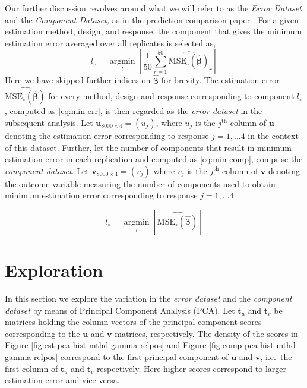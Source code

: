 \documentclass[12pt,3p,authoryear]{elsarticle}
\begin{document}
Our further discussion revolves around what we will refer to as the \emph{Error Dataset} and the \emph{Component Dataset,} as in the prediction comparison paper \citet{rimal2019pred}. For a given estimation method, design, and response, the component that gives the minimum estimation error averaged over all replicates is selected as,
\begin{equation}
  l_\circ = \operatorname*{argmin}_{l}\left[\frac{1}{50}\sum_{r=1}^{50}{\widehat{\text{MSE}_\circ\left(\widehat{\boldsymbol{\beta}}\right)}_{r}}\right]
  \label{eq:min-err}
\end{equation}
Here we have skipped further indices on \(\boldsymbol{\widehat{\boldsymbol{\beta}}}\) for brevity. The estimation error \(\widehat{\text{MSE}_\circ\left(\widehat{\boldsymbol{\beta}}\right)}\) for every method, design and response corresponding to component \(l_\circ\), computed as \eqref{eq:min-err}, is then regarded as the \emph{error dataset} in the subsequent analysis. Let \(\mathbf{u}_{8000\times4}=(u_j)\), where \(u_j\) is the \(j^\text{th}\) column of \(\mathbf{u}\) denoting the estimation error corresponding to response \(j=1, \ldots 4\) in the context of this dataset. Further, let the number of components that
result in minimum estimation error in each replication and computed as \eqref{eq:min-comp}, comprise the \emph{component dataset}. Let \(\mathbf{v}_{8000\times4}=(v_j)\) where \(v_j\) is the \(j^\text{th}\) column of \(\mathbf{v}\) denoting the outcome variable measuring the number of components used to obtain minimum estimation error corresponding to response \(j=1, \ldots 4\).

\begin{equation}
  l_{\circ} = \operatorname*{argmin}_{l}\left[\widehat{\text{MSE}_\circ\left(\widehat{\boldsymbol{\beta}}\right)}\right]
  \label{eq:min-comp}
\end{equation}

\hypertarget{exploration}{%
\section{Exploration}\label{exploration}}

In this section we explore the variation in the \emph{error dataset} and the \emph{component dataset} by means of Principal Component Analysis (PCA). Let \(\mathbf{t}_u\) and \(\mathbf{t}_v\) be matrices holding the column vectors of the principal component scores corresponding to the \(\mathbf{u}\) and \(\mathbf{v}\) matrices, respectively. The density of the scores in Figure \ref{fig:est-pca-hist-mthd-gamma-relpos} and Figure \ref{fig:comp-pca-hist-mthd-gamma-relpos} correspond to the first principal component of \(\mathbf{u}\) and \(\mathbf{v}\), i.e.~the first column of \(\mathbf{t}_u\) and \(\mathbf{t}_v\) respectively. Here higher scores correspond to larger estimation error and vice versa.
\end{document}
